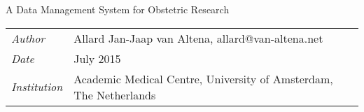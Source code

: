 \thispagestyle{empty}

\addvspace{40mm}

\begin{center}
	\bigskip
	\huge{A Data Management System for Obstetric Research}
\end{center}


\addvspace{140mm}

\begin{center}
	\begin{tabular}{l l}
		\textit{Author}			&	Allard Jan-Jaap van Altena, allard@van-altena.net\\
		\textit{Date}			&	July 2015 \\
		\textit{Institution}	&	Academic Medical Centre, University of Amsterdam, The Netherlands \\
	\end{tabular}
\end{center}

\clearpage